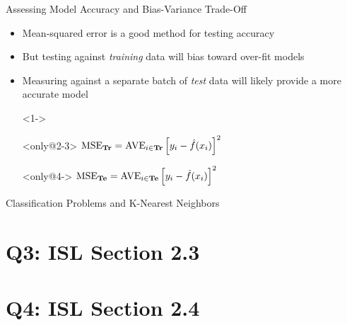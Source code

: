 \documentclass{beamer}
\begin{document}
\begin{frame}{Assessing Model Accuracy and Bias-Variance Trade-Off}
	\begin{itemize}
		\item<1-> Mean-squared error is a good method for testing accuracy
		\item<3-> But testing against \emph{training} data will bias toward over-fit models
		\item<4-> Measuring against a separate batch of \emph{test} data will likely provide a more accurate model 
		\item[]<1->
		\item[]<only@2-3> \hspace{3em}
			$\text{MSE}_{\text{\textbf{Tr}}}=\text{AVE}_{i\in\text{\textbf{Tr}}}\left[y_i-\hat{f}(x_i)\right]^2$
		\item[]<only@4-> \hspace{3em}
			$\text{MSE}_{\text{\textbf{Te}}}=\text{AVE}_{i\in\text{\textbf{Te}}}\left[y_i-\hat{f}(x_i)\right]^2$
	\end{itemize}
\end{frame}


\begin{frame}{Classification Problems and K-Nearest Neighbors}
	\begin{itemize}[<+->]
	
	\end{itemize}
\end{frame}

\section[Q3]{Q3: ISL Section 2.3}
\section[Q4]{Q4: ISL Section 2.4}
\end{document}
